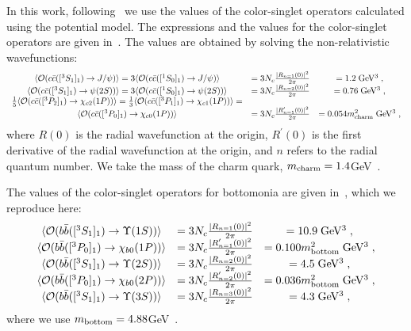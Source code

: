 \documentclass[article,showpacs,preprintnumbers,amsmath,amssymb]{revtex4}
\newcommand{\barc}{{\bar{c}}}
\newcommand{\barb}{{\bar{b}}}
\newcommand{\calO}{{\cal{O}}}
\newcommand{\charm}{{\rm{charm}}}
\newcommand{\bottom}{{\rm{bottom}}}
\begin{document}
In this work, following~\cite{Cho:1995ce,Cho:1995vh} we use the values of the
color-singlet operators calculated using the potential model.  The expressions
and the values for the color-singlet operators are given
in~\cite{Cho:1995ce,Cho:1995vh,Eichten:1994gt}. The values are obtained by
solving the non-relativistic wavefunctions:
\begin{equation}
\begin{split}
\begin{array}{ccc}
\langle \calO(c\barc([^3S_1]_{1})\rightarrow J/\psi)\rangle 
=3\langle \calO(c\barc([^1S_0]_{1})\rightarrow J/\psi)\rangle
&=3N_c\frac{|R_{n=1}(0)|^2}{2\pi}
&=1.2\;{\rm GeV^3} \;, \\
\langle \calO(c\barc([^3S_1]_{1})\rightarrow \psi(2S))\rangle 
=3\langle \calO(c\barc([^1S_0]_{1})\rightarrow \psi(2S))\rangle
&=3N_c\frac{|R_{n=2}(0)|^2}{2\pi}
&=0.76\;{\rm GeV^3} \;, \\
\frac{1}{5}\langle \calO(c\barc([^3P_2]_{1})\rightarrow \chi_{c2}(1P))\rangle
=\frac{1}{3}\langle \calO(c\barc([^3P_1]_{1})\rightarrow \chi_{c1}(1P))\rangle 
=&&\\ 
\langle \calO(c\barc([^3P_0]_{1})\rightarrow \chi_{c0}(1P))\rangle 
&=3N_c\frac{|R^\prime_{n=1}(0)|^2}{2\pi}
&=0.054 m_{\charm}^2\;{\rm GeV^3}\; ,
\end{array}
\label{eq:charmsinglet}
\end{split}
\end{equation}
where $R(0)$ is the radial wavefunction at the origin, $R^\prime(0)$ is the
first derivative of the radial wavefunction at the origin, and $n$ refers to
the radial quantum number. We take the mass of the charm quark,
$m_{\charm}=1.4$GeV~\cite{Cooper:LongAndShort}. 

The values of the color-singlet operators for  bottomonia are given
in~\cite{Braaten:2000cm}, which we reproduce here:
\begin{equation}
\begin{split}
\begin{array}{ccc}
\langle \calO(b\barb([^3S_1]_{1})\rightarrow \Upsilon(1S))\rangle &=
3N_c\frac{|R_{n=1}(0)|^2}{2\pi}
&=10.9\;{\rm GeV^3} \;, \\
\langle \calO(b\barb([^3P_0]_{1})\rightarrow \chi_{b0}(1P))\rangle &= 
3N_c\frac{|R^\prime_{n=1}(0)|^2}{2\pi}
&=0.100 m_{\bottom}^2\;{\rm GeV^3}\;, \\
\langle \calO(b\barb([^3S_1]_{1})\rightarrow \Upsilon(2S))\rangle &=
3N_c\frac{|R_{n=2}(0)|^2}{2\pi}
&=4.5\;{\rm GeV^3}\;, \\
\langle \calO(b\barb([^3P_0]_{1})\rightarrow \chi_{b0}(2P))\rangle &= 
3N_c\frac{|R^\prime_{n=2}(0)|^2}{2\pi}
&=0.036 m_{\bottom}^2 \;{\rm GeV^3} \;, \\
\langle \calO(b\barb([^3S_1]_{1})\rightarrow \Upsilon(3S))\rangle &=
3N_c\frac{|R_{n=3}(0)|^2}{2\pi}
&=4.3\;{\rm GeV^3} \; ,
\end{array}
\label{eq:bottomsinglet}
\end{split}
\end{equation}
where we use $m_{\bottom}=4.88$GeV~\cite{Cho:1995ce,Cho:1995vh}.
\end{document}
